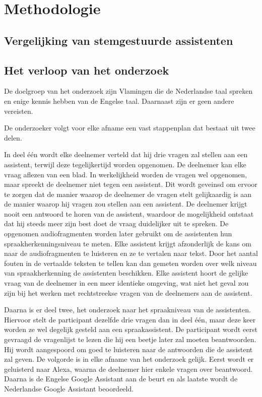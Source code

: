 
\chapter{Methodologie}
\label{ch:methodologie}

\section{Vergelijking van stemgestuurde assistenten}
\label{sec:vergelijking van stemgestuurde assistenten}

\section{Het verloop van het onderzoek}
De doelgroep van het onderzoek zijn Vlamingen die de Nederlandse taal spreken en enige kennis hebben van de Engelse taal. Daarnaast zijn er geen andere vereisten.

De onderzoeker volgt voor elke afname een vast stappenplan dat bestaat uit twee delen.

In deel één wordt elke deelnemer verteld dat hij drie vragen zal stellen aan een assistent, terwijl deze tegelijkertijd worden opgenomen. De deelnemer kan elke vraag aflezen van een blad. In werkelijkheid worden de vragen wel opgenomen, maar spreekt de deelnemer niet tegen een assistent. Dit wordt geveinsd om ervoor te zorgen dat de manier waarop de deelnemer de vragen stelt gelijkaardig is aan de manier waarop hij vragen zou stellen aan een assistent. De deelnemer krijgt nooit een antwoord te horen van de assistent, waardoor de mogelijkheid ontstaat dat hij steeds meer zijn best doet de vraag duidelijker uit te spreken.
De opgenomen audiofragmenten worden later gebruikt om de assistenten hun spraakherkenningsniveau te meten. Elke assistent krijgt afzonderlijk de kans om naar de audiofragmenten te luisteren en ze te vertalen naar tekst. Door het aantal fouten in de vertaalde teksten te tellen kan dan gemeten worden over welk niveau van spraakherkenning de assistenten beschikken. Elke assistent hoort de gelijke vraag van de deelnemer in een meer identieke omgeving, wat niet het geval zou zijn bij het werken met rechtstreekse vragen van de deelnemers aan de assistent. 

Daarna is er deel twee, het onderzoek naar het spraakniveau van de assistenten. Hiervoor stelt de participant dezelfde drie vragen dan in deel één, maar deze keer worden ze wel degelijk gesteld aan een spraakassistent. De participant wordt eerst gevraagd de vragenlijst te lezen die hij een beetje later zal moeten beantwoorden. Hij wordt aangespoord om goed te luisteren naar de antwoorden die de assistent zal geven. De volgorde is in elke afname van het onderzoek gelijk. Eerst wordt er geluisterd naar Alexa, waarna de deelnemer hier enkele vragen over beantwoord. Daarna is de Engelse Google Assistant aan de beurt en als laatste wordt de Nederlandse Google Assistant beoordeeld.

